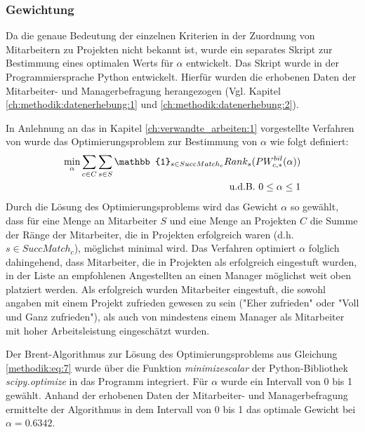 \subsubsection{Gewichtung}
\label{ch:methodik:auswertung:gewichtung}
Da die genaue Bedeutung der einzelnen Kriterien in der Zuordnung von Mitarbeitern zu Projekten nicht bekannt ist, wurde ein separates Skript zur Bestimmung eines optimalen Werts für $\alpha$ entwickelt.
Das Skript wurde in der Programmiersprache Python entwickelt.
Hierfür wurden die erhobenen Daten der Mitarbeiter- und Managerbefragung herangezogen (Vgl. Kapitel \ref{ch:methodik:datenerhebung:1} und \ref{ch:methodik:datenerhebung:2}).

In Anlehnung an das in Kapitel \ref{ch:verwandte_arbeiten:1} vorgestellte Verfahren von \textcite[S. 131ff.]{kleinerman:2:inproceedings} wurde das Optimierungsproblem zur Bestimmung von $\alpha$ wie folgt definiert:
\begin{equation}\label{methodik:eq:7}
    \begin{aligned}
        \min_{\alpha} \sum_{c \in C} \sum_{s \in S} \mathbb{1}_{s \in SuccMatch_{c}} Rank_{s} (PW_{c,*}^{bil}(\alpha))\\
        \textnormal{u.d.B. } 0 \leq \alpha \leq 1\\
    \end{aligned}
\end{equation}
Durch die Lösung des Optimierungsproblems wird das Gewicht $\alpha$ so gewählt, dass für eine Menge an Mitarbeiter $S$ und eine Menge an Projekten $C$ die Summe der Ränge der Mitarbeiter, die in Projekten erfolgreich waren (d.h. $s \in SuccMatch_{c}$), möglichst minimal wird.
Das Verfahren optimiert $\alpha$ folglich dahingehend, dass Mitarbeiter, die in Projekten als erfolgreich eingestuft wurden, in der Liste an empfohlenen Angestellten an einen Manager möglichst weit oben platziert werden.
Als erfolgreich wurden Mitarbeiter eingestuft, die sowohl angaben mit einem Projekt zufrieden gewesen zu sein ("Eher zufrieden" oder "Voll und Ganz zufrieden"), als auch von mindestens einem Manager als Mitarbeiter mit hoher Arbeitsleistung eingeschätzt wurden.

Der Brent-Algorithmus zur Lösung des Optimierungsproblems aus Gleichung \ref{methodik:eq:7} wurde über die Funktion \textit{minimize\textunderscore scalar} der Python-Bibliothek \textit{scipy.opti\-mize} in das Programm integriert.
Für $\alpha$ wurde ein Intervall von 0 bis 1 gewählt.
Anhand der erhobenen Daten der Mitarbeiter- und Managerbefragung ermittelte der Algorithmus in dem Intervall von 0 bis 1 das optimale Gewicht bei $\alpha = 0.6342$.

